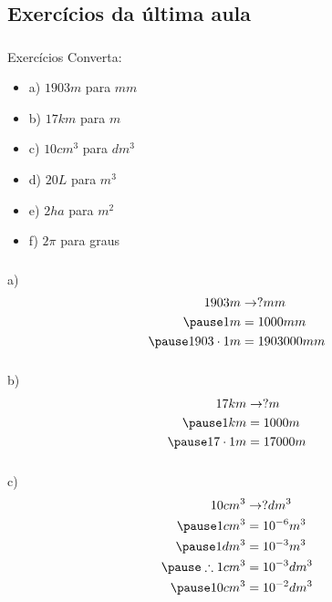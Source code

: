 \documentclass[handout]{beamer}
\begin{document}

\subsection{Exercícios da última aula}
\begin{frame}\frametitle{\subsecname}
    \begin{block}{Exercícios}
        Converta:
        \begin{itemize}
            \item a) $1903m$ para $mm$
            \item b) $17km$ para $m$
            \item c) $10cm^3$ para $dm^3$
            \item d) $20L$ para $m^3$
            \item e) $2ha$ para $m^2$
            \item f) $2\pi$ para graus
        \end{itemize}
    \end{block}
\end{frame}


\begin{frame}\frametitle{\subsecname}
    a)
    \begin{align*}
        1903m &\rightarrow ? mm\\ \pause
        1m &= 1000mm \\ \pause
        1903\cdot1m&=1903000mm\\
    \end{align*}
\end{frame}

\begin{frame}\frametitle{\subsecname}
    b)
    \begin{align*}
        17km &\rightarrow ? m\\ \pause
        1km &= 1000m \\ \pause
        17\cdot1m&=17000m\\
    \end{align*}
\end{frame}

\begin{frame}\frametitle{\subsecname}
    c)
    \begin{align*}
        10cm^3 &\rightarrow ? dm^3\\ \pause
        1cm^3 &= 10^{-6}m^3 \\ \pause
        1dm^3 &= 10^{-3}m^3 \\ \pause
        \therefore 1cm^3&=10^{-3}dm^3\\ \pause
        10cm^3 &= 10^{-2}dm^3
    \end{align*}
\end{frame}
\end{document}
